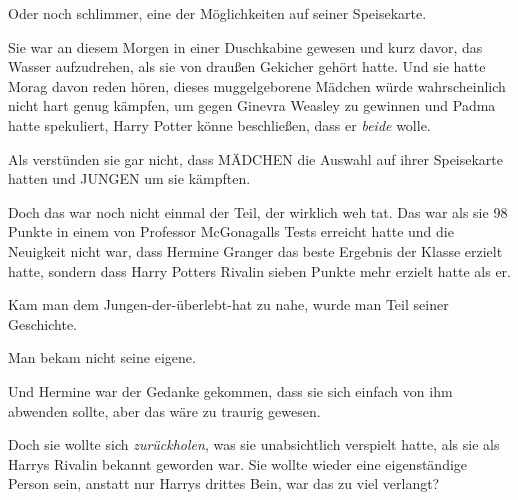Oder noch schlimmer, eine der Möglichkeiten auf seiner Speisekarte.

Sie war an diesem Morgen in einer Duschkabine gewesen und kurz davor, das Wasser aufzudrehen, als sie von draußen Gekicher gehört hatte. Und sie hatte Morag davon reden hören, dieses muggelgeborene Mädchen würde wahrscheinlich nicht hart genug kämpfen, um gegen Ginevra Weasley zu gewinnen und Padma hatte spekuliert, Harry Potter könne beschließen, dass er \emph{beide} wolle.

Als verstünden sie gar nicht, dass MÄDCHEN die Auswahl auf ihrer Speisekarte hatten und JUNGEN um sie kämpften.

Doch das war noch nicht einmal der Teil, der wirklich weh tat. Das war als sie 98 Punkte in einem von Professor McGonagalls Tests erreicht hatte und die Neuigkeit nicht war, dass Hermine Granger das beste Ergebnis der Klasse erzielt hatte, sondern dass Harry Potters Rivalin sieben Punkte mehr erzielt hatte als er.

Kam man dem Jungen-der-überlebt-hat zu nahe, wurde man Teil seiner Geschichte.

Man bekam nicht seine eigene.

Und Hermine war der Gedanke gekommen, dass sie sich einfach von ihm abwenden sollte, aber das wäre zu traurig gewesen.

Doch sie wollte sich \emph{zurückholen}, was sie unabsichtlich verspielt hatte, als sie als Harrys Rivalin bekannt geworden war. Sie wollte wieder eine eigenständige Person sein, anstatt nur Harrys drittes Bein, war das zu viel verlangt?

